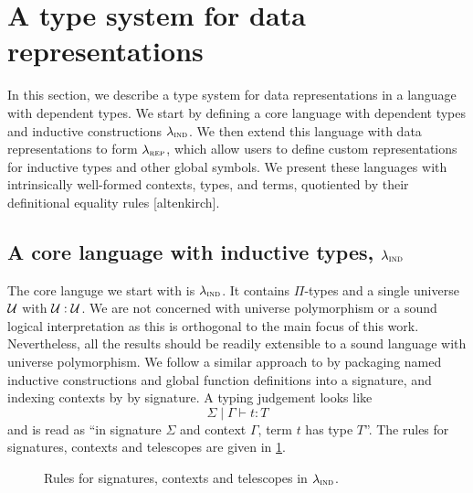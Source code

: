 \section{A type system for data representations}\label{sec:type-system}

In this section, we describe a type system for data representations in a
language with dependent types. We start by defining a core language with
dependent types and inductive constructions $\lambda_{\textsc{ind}}$. We then extend this
language with data representations to form $\lambda_{\textsc{rep}}$, which allow users to
define custom representations for inductive types and other global symbols.
We present these languages with intrinsically well-formed contexts, types, and
terms, quotiented by their definitional equality rules [altenkirch].

\subsection{A core language with inductive types, $\lambda_{\textsc{ind}}$}\label{sub:lambdaind}

The core languge we start with is $\lambda_{\textsc{ind}}$. It contains $\Pi$-types and a
single universe $\mathcal{U}$ with $\mathcal{U} : \mathcal{U}$. We are not concerned with universe
polymorphism or a sound logical interpretation as this is orthogonal to the main
focus of this work. Nevertheless, all the results should be readily extensible
to a sound language with universe polymorphism.
We follow a similar approach to
\cite{Cockx2018-fk} by packaging named inductive constructions and
global function definitions into a signature, and indexing contexts by
by signature. A typing judgement looks like
\[
  \Sigma \mid \Gamma \vdash t : T
\]
and is read as ``in signature $\Sigma$ and context $\Gamma$, term $t$ has type
$T$''. The rules for signatures, contexts and telescopes are given in \cref{fig:lambdaind-sig-rules}.

\begin{figure}[h]
  \caption{Rules for signatures, contexts and telescopes in $\lambda_{\textsc{ind}}$.}
  \label{fig:lambdaind-sig-rules}
\end{figure}

